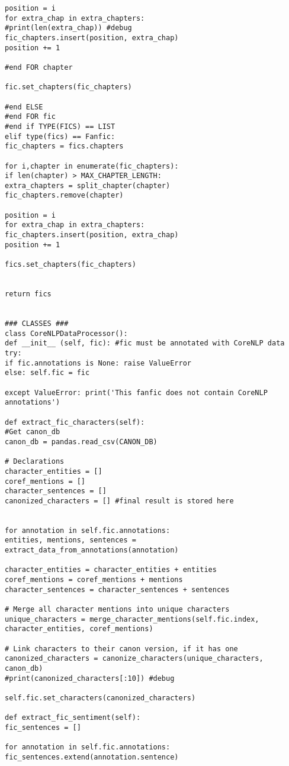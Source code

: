\documentclass{pre-tfg}
\begin{document}
\begin{lstlisting}[style=consola]
position = i
for extra_chap in extra_chapters:
#print(len(extra_chap)) #debug
fic_chapters.insert(position, extra_chap)
position += 1

#end FOR chapter

fic.set_chapters(fic_chapters)

#end ELSE
#end FOR fic
#end if TYPE(FICS) == LIST
elif type(fics) == Fanfic:
fic_chapters = fics.chapters

for i,chapter in enumerate(fic_chapters):
if len(chapter) > MAX_CHAPTER_LENGTH:
extra_chapters = split_chapter(chapter)
fic_chapters.remove(chapter)

position = i
for extra_chap in extra_chapters:
fic_chapters.insert(position, extra_chap)
position += 1

fics.set_chapters(fic_chapters)


return fics


### CLASSES ###
class CoreNLPDataProcessor():
def __init__ (self, fic): #fic must be annotated with CoreNLP data
try: 
if fic.annotations is None: raise ValueError
else: self.fic = fic

except ValueError: print('This fanfic does not contain CoreNLP annotations')

def extract_fic_characters(self):
#Get canon_db
canon_db = pandas.read_csv(CANON_DB)

# Declarations
character_entities = []
coref_mentions = []
character_sentences = []
canonized_characters = [] #final result is stored here


for annotation in self.fic.annotations:
entities, mentions, sentences = extract_data_from_annotations(annotation)

character_entities = character_entities + entities
coref_mentions = coref_mentions + mentions
character_sentences = character_sentences + sentences

# Merge all character mentions into unique characters
unique_characters = merge_character_mentions(self.fic.index, character_entities, coref_mentions)

# Link characters to their canon version, if it has one
canonized_characters = canonize_characters(unique_characters, canon_db)
#print(canonized_characters[:10]) #debug

self.fic.set_characters(canonized_characters)

def extract_fic_sentiment(self):
fic_sentences = []

for annotation in self.fic.annotations: fic_sentences.extend(annotation.sentence)


\end{lstlisting}
\end{document}
